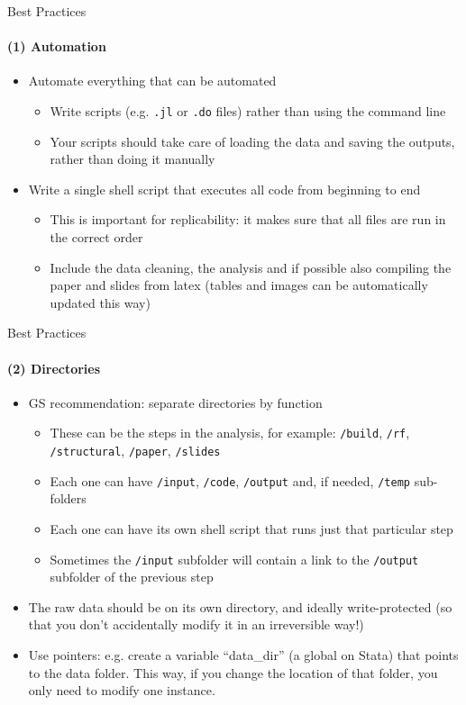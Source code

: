 \documentclass[10pt, aspectratio=169, xcolor=dvipsnames]{beamer}
\let\olditem\item
\renewcommand{\item}{%
\olditem\vspace{0.3em}}
\begin{document}
\begin{frame}[t]{Best Practices}
    \framesubtitle{(1) Automation}

    \normalsize\vspace{0.5em} \begin{itemize}
        \item Automate everything that can be automated \begin{itemize}
            \item Write scripts (e.g. \texttt{.jl} or \texttt{.do} files) rather than using the command line
            \item Your scripts should take care of loading the data and saving the outputs, rather than doing it manually
        \end{itemize}
        \item Write a single shell script that executes all code from beginning to end \begin{itemize}
            \item This is important for replicability: it makes sure that all files are run in the correct order
            \item Include the data cleaning, the analysis and if possible also compiling the paper and slides from latex (tables and images can be automatically updated this way)
        \end{itemize}
    \end{itemize}
\end{frame}

\begin{frame}[t]{Best Practices}
    \framesubtitle{(2) Directories}

    \normalsize\vspace{0.5em} \begin{itemize}
        \item GS recommendation: separate directories by function \begin{itemize}
            \item These can be the steps in the analysis, for example: \texttt{/build}, \texttt{/rf}, \texttt{/structural}, \texttt{/paper}, \texttt{/slides}
            \item Each one can have \texttt{/input}, \texttt{/code}, \texttt{/output} and, if needed, \texttt{/temp} sub-folders
            \item Each one can have its own shell script that runs just that particular step
            \item Sometimes the \texttt{/input} subfolder will contain a link to the \texttt{/output} subfolder of the previous step
        \end{itemize}
        \item The raw data should be on its own directory, and ideally write-protected (so that you don't accidentally modify it in an irreversible way!)
        \item Use pointers: e.g. create a variable ``data\_dir'' (a global on Stata) that points to the data folder. This way, if you change the location of that folder, you only need to modify one instance.
    \end{itemize}
\end{frame}
\end{document}
